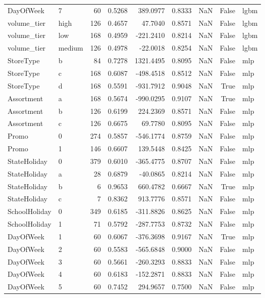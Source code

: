 \begin{table}
\begin{tabular}{llrrrrrrl}
DayOfWeek & 7 & 60 & 0.5268 & 389.0977 & 0.8333 & NaN & False & lgbm \\
volume\_tier & high & 126 & 0.4657 & 47.7040 & 0.8571 & NaN & False & lgbm \\
volume\_tier & low & 168 & 0.4959 & -221.2410 & 0.8214 & NaN & False & lgbm \\
volume\_tier & medium & 126 & 0.4978 & -22.0018 & 0.8254 & NaN & False & lgbm \\
StoreType & b & 84 & 0.7278 & 1321.4495 & 0.8095 & NaN & False & mlp \\
StoreType & c & 168 & 0.6087 & -498.4518 & 0.8512 & NaN & False & mlp \\
StoreType & d & 168 & 0.5591 & -931.7912 & 0.9048 & NaN & True & mlp \\
Assortment & a & 168 & 0.5674 & -990.0295 & 0.9107 & NaN & True & mlp \\
Assortment & b & 126 & 0.6199 & 224.2369 & 0.8571 & NaN & False & mlp \\
Assortment & c & 126 & 0.6675 & 69.7780 & 0.8095 & NaN & False & mlp \\
Promo & 0 & 274 & 0.5857 & -546.1774 & 0.8759 & NaN & False & mlp \\
Promo & 1 & 146 & 0.6607 & 139.5448 & 0.8425 & NaN & False & mlp \\
StateHoliday & 0 & 379 & 0.6010 & -365.4775 & 0.8707 & NaN & False & mlp \\
StateHoliday & a & 28 & 0.6879 & -40.0865 & 0.8214 & NaN & False & mlp \\
StateHoliday & b & 6 & 0.9653 & 660.4782 & 0.6667 & NaN & True & mlp \\
StateHoliday & c & 7 & 0.8362 & 913.7776 & 0.8571 & NaN & False & mlp \\
SchoolHoliday & 0 & 349 & 0.6185 & -311.8826 & 0.8625 & NaN & False & mlp \\
SchoolHoliday & 1 & 71 & 0.5792 & -287.7753 & 0.8732 & NaN & False & mlp \\
DayOfWeek & 1 & 60 & 0.6067 & -376.3698 & 0.9167 & NaN & True & mlp \\
DayOfWeek & 2 & 60 & 0.5583 & -565.6848 & 0.9000 & NaN & False & mlp \\
DayOfWeek & 3 & 60 & 0.5661 & -260.3293 & 0.8833 & NaN & False & mlp \\
DayOfWeek & 4 & 60 & 0.6183 & -152.2871 & 0.8833 & NaN & False & mlp \\
DayOfWeek & 5 & 60 & 0.7452 & 294.9657 & 0.7500 & NaN & False & mlp \\

\end{tabular}
\end{table}
